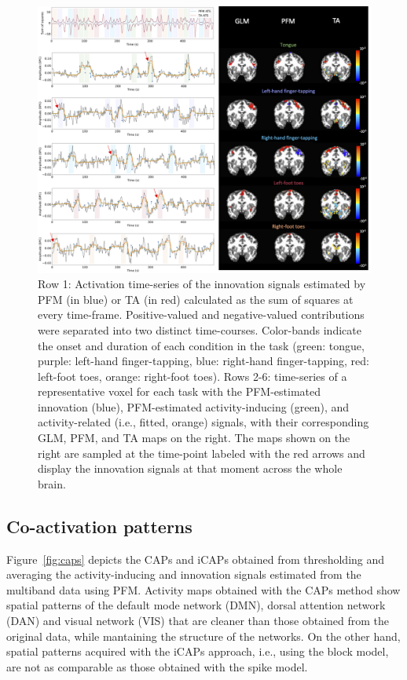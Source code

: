 \begin{figure}[t!]
    \begin{center}
        \includegraphics[width=\textwidth]{figures/task_maps.png}
    \end{center}
    \caption{Row 1: Activation time-series of the innovation signals estimated by PFM (in blue) or TA (in red) calculated as the sum of squares at every time-frame. Positive-valued and negative-valued contributions were separated into two distinct time-courses. Color-bands indicate the onset and duration of each condition in the task (green: tongue, purple: left-hand finger-tapping, blue: right-hand finger-tapping, red: left-foot toes, orange: right-foot toes). Rows 2-6: time-series of a representative voxel for each task with the PFM-estimated innovation (blue), PFM-estimated activity-inducing (green), and activity-related (i.e., fitted, orange) signals, with their corresponding GLM, PFM, and TA maps on the right. The maps shown on the right are sampled at the time-point labeled with the red arrows and display the innovation signals at that moment across the whole brain.}
\label{fig:task_maps}
\end{figure}

\subsection{Co-activation patterns}

Figure~\ref{fig:caps} depicts the CAPs and iCAPs obtained from thresholding and averaging the activity-inducing and innovation signals estimated from the multiband data using PFM. Activity maps obtained with the CAPs method show spatial patterns of the default mode network (DMN), dorsal attention network (DAN) and visual network (VIS) that are cleaner than those obtained from the original data, while mantaining the structure of the networks. On the other hand, spatial patterns acquired with the iCAPs approach, i.e., using the block model, are not as comparable as those obtained with the spike model. 

